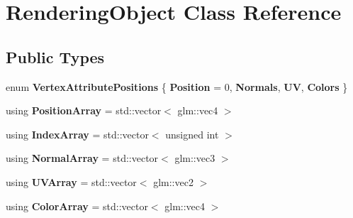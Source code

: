 \hypertarget{class_rendering_object}{}\section{Rendering\+Object Class Reference}
\label{class_rendering_object}
\subsection*{Public Types}
\begin{DoxyCompactItemize}
\item 
\hypertarget{class_rendering_object_ab772f569ef63a1db07db29a744b519ee}{}enum {\bfseries Vertex\+Attribute\+Positions} \{ {\bfseries Position} = 0, 
{\bfseries Normals}, 
{\bfseries U\+V}, 
{\bfseries Colors}
 \}\label{class_rendering_object_ab772f569ef63a1db07db29a744b519ee}

\item 
\hypertarget{class_rendering_object_a1223b9cf03f2029b9c43d71042c2a18e}{}using {\bfseries Position\+Array} = std\+::vector$<$ glm\+::vec4 $>$\label{class_rendering_object_a1223b9cf03f2029b9c43d71042c2a18e}

\item 
\hypertarget{class_rendering_object_a9931c88bca3384065c6691dfe1e60af1}{}using {\bfseries Index\+Array} = std\+::vector$<$ unsigned int $>$\label{class_rendering_object_a9931c88bca3384065c6691dfe1e60af1}

\item 
\hypertarget{class_rendering_object_a327c4d892de8d6138fb59afa6d078257}{}using {\bfseries Normal\+Array} = std\+::vector$<$ glm\+::vec3 $>$\label{class_rendering_object_a327c4d892de8d6138fb59afa6d078257}

\item 
\hypertarget{class_rendering_object_a504ecd45ebe36dfa5b78c46d64d9904a}{}using {\bfseries U\+V\+Array} = std\+::vector$<$ glm\+::vec2 $>$\label{class_rendering_object_a504ecd45ebe36dfa5b78c46d64d9904a}

\item 
\hypertarget{class_rendering_object_a8a12e1f9be788d99af6c089e1c600022}{}using {\bfseries Color\+Array} = std\+::vector$<$ glm\+::vec4 $>$\label{class_rendering_object_a8a12e1f9be788d99af6c089e1c600022}

\end{DoxyCompactItemize}
